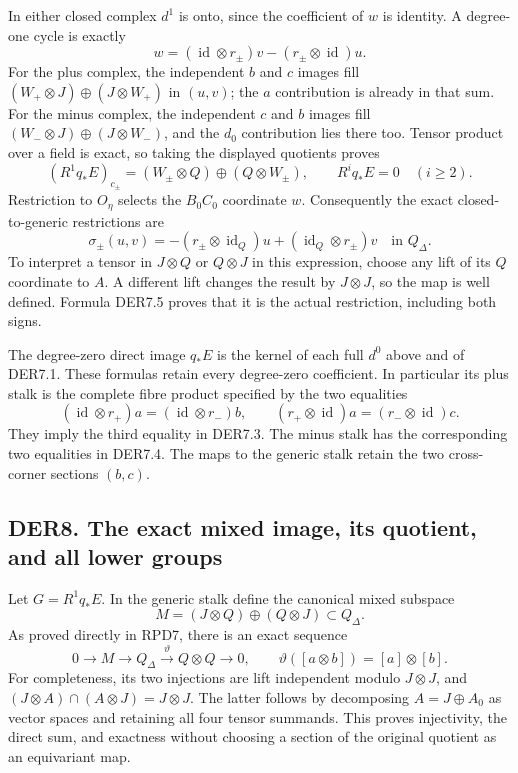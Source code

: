 In either closed complex \(d^1\) is onto, since the coefficient of \(w\)
is identity. A degree-one cycle is exactly \[
w=(\operatorname{id}\otimes r_\pm)v
 -(r_\pm\otimes\operatorname{id})u.
\tag{DER7.5}
\] For the plus complex, the independent \(b\) and \(c\) images fill
\((W_+\otimes J)\oplus(J\otimes W_+)\) in \((u,v)\); the \(a\)
contribution is already in that sum. For the minus complex, the
independent \(c\) and \(b\) images fill
\((W_-\otimes J)\oplus(J\otimes W_-)\), and the \(d_0\) contribution
lies there too. Tensor product over a field is exact, so taking the
displayed quotients proves \[
(R^1q_*E)_{c_\pm}
=(W_\pm\otimes Q)\oplus(Q\otimes W_\pm),\qquad
R^iq_*E=0\quad(i\geq2).
\tag{DER7.6}
\] Restriction to \(O_\eta\) selects the \(B_0C_0\) coordinate \(w\).
Consequently the exact closed-to-generic restrictions are \[
\sigma_\pm(u,v)
=-(r_\pm\otimes\operatorname{id}_Q)u
 +(\operatorname{id}_Q\otimes r_\pm)v
 \quad\text{in }Q_\Delta .
\tag{DER7.7}
\] To interpret a tensor in \(J\otimes Q\) or \(Q\otimes J\) in this
expression, choose any lift of its \(Q\) coordinate to \(A\). A
different lift changes the result by \(J\otimes J\), so the map is well
defined. Formula DER7.5 proves that it is the actual restriction,
including both signs.

The degree-zero direct image \(q_*E\) is the kernel of each full \(d^0\)
above and of DER7.1. These formulas retain every degree-zero
coefficient. In particular its plus stalk is the complete fibre product
specified by the two equalities \[
(\operatorname{id}\otimes r_+)a=(\operatorname{id}\otimes r_-)b,
\qquad
(r_+\otimes\operatorname{id})a=(r_-\otimes\operatorname{id})c.
\tag{DER7.8}
\] They imply the third equality in DER7.3. The minus stalk has the
corresponding two equalities in DER7.4. The maps to the generic stalk
retain the two cross-corner sections \((b,c)\).

\subsection{DER8. The exact mixed image, its quotient, and all lower
groups}\label{der8.-the-exact-mixed-image-its-quotient-and-all-lower-groups}

Let \(G=R^1q_*E\). In the generic stalk define the canonical mixed
subspace \[
M=(J\otimes Q)\oplus(Q\otimes J)\subset Q_\Delta.
\] As proved directly in RPD7, there is an exact sequence \[
0\to M\longrightarrow Q_\Delta
 \xrightarrow{\vartheta}Q\otimes Q\to0,
\qquad \vartheta([a\otimes b])=[a]\otimes[b].
\tag{DER8.1}
\] For completeness, its two injections are lift independent modulo
\(J\otimes J\), and \((J\otimes A)\cap(A\otimes J)=J\otimes J\). The
latter follows by decomposing \(A=J\oplus A_0\) as vector spaces and
retaining all four tensor summands. This proves injectivity, the direct
sum, and exactness without choosing a section of the original quotient
as an equivariant map.

